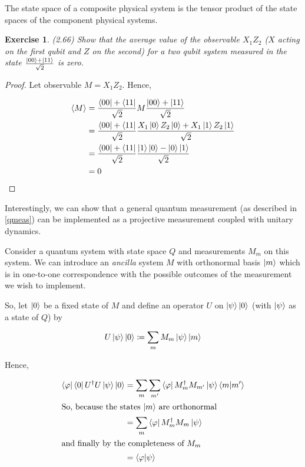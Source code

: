 \documentclass[11pt]{article}
\newcommand\0{\mathbf{0}}
\newcommand\<{\langle}
\renewcommand\>{\rangle}
\renewcommand\phi{\varphi}
\newtheorem{exercise}[theorem]{Exercise}
\begin{document}
The state space of a composite physical system is the tensor product of the state spaces of the component physical systems. 

\begin{exercise} (2.66)
	Show that the average value of the observable $X_1Z_2$ ($X$ acting on the first qubit and $Z$ on the second) for a two qubit system measured in the state $\frac{\ket{00} + \ket{11}}{\sqrt{2}}$ is zero.
\end{exercise}

\begin{proof}
	Let observable $M = X_1Z_2$. Hence, 
	
	\begin{align*}
	\langle M \rangle &= \frac{\bra{00} + \bra{11}}{\sqrt{2}} M \frac{\ket{00} + \ket{11}}{\sqrt{2}}\\	
	&= \frac{\bra{00} + \bra{11}}{\sqrt{2}}\frac{X_1\ket{0}Z_2\ket{0} + X_1\ket{1}Z_2\ket{1}}{\sqrt{2}} \\
	&= \frac{\bra{00} + \bra{11}}{\sqrt{2}}\frac{\ket{1}\ket{0} - \ket{0}\ket{1}}{\sqrt{2}} \\
	&= 0
	\end{align*}
\end{proof}
 
Interestingly, we can show that a general quantum measurement (as described in \ref{qmeas}) can be implemented as a projective measurement coupled with unitary dynamics.

Consider a quantum system with state space $Q$ and measurements $M_m$ on this system. We can introduce an \textit{ancilla} system $M$ with orthonormal basis $\ket{m}$ which is in one-to-one correspondence with the possible outcomes of the measurement we wish to implement. 

So, let $\ket{0}$ be a fixed state of $M$ and define an operator $U$ on $\ket{\psi}\ket{0}$ (with $\ket{\psi}$ as a state of $Q$) by

\begin{align*}
U\ket{\psi}\ket{0} \coloneqq \sum_m M_m \ket{\psi}\ket{m}
\end{align*}

Hence,

\begin{align*}
\bra{\phi}\bra{0}U^\dag U \ket{\psi}	 \ket{0} &= \sum_m \sum_{m'} \bra{\phi} M_m^\dag M_{m'} \ket{\psi}\bra{m}\ket{m'} \\
\intertext{So, because the states $\ket{m}$ are orthonormal}
&= \sum_m\bra{\phi} M_m^\dag M_{m} \ket{\psi} \\
\intertext{and finally by the completeness of $M_m$}
&= \bra{\phi}\ket{\psi}
\end{align*}
\end{document}
